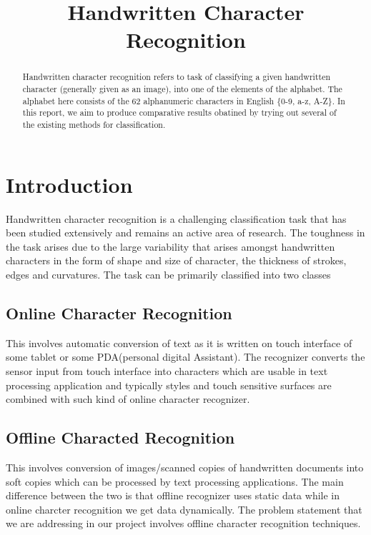 \documentclass[conference]{IEEEtran}
\begin{document}
\title{Handwritten Character Recognition}
\author{
\and
{}
\and
{}
\and
{}
}
\maketitle


\begin{abstract}
	Handwritten character recognition refers to task of classifying a given handwritten character (generally given as an image), into one of the elements of the alphabet.  The alphabet here consists of the 62 alphanumeric characters in English \{0-9, a-z, A-Z\}. In this report, we aim to produce comparative results obatined by trying out several of the existing methods for classification.
\end{abstract}

\section{Introduction}
Handwritten character recognition is a challenging classification task that has been studied extensively and remains an active area of research. The toughness in the task arises due to the large variability that arises amongst handwritten characters in the form of shape and size of character, the thickness of strokes, edges and curvatures. The task can be primarily classified into two classes

\subsection{Online Character Recognition}
This involves automatic conversion of text as it is written on touch interface of some tablet or some PDA(personal digital Assistant). The recognizer converts the sensor input from touch interface into characters which are usable in text processing application and typically styles and touch sensitive surfaces are combined with such kind of online character recognizer. 

\subsection{Offline Characted Recognition}
This involves conversion of images/scanned copies of handwritten documents into soft copies which can be processed by text processing applications. 
The main difference between the two is that offline recognizer uses static data while in online charcter recognition we get data dynamically. 
The problem statement that we are addressing in our project involves offline character recognition techniques.
\end{document}
